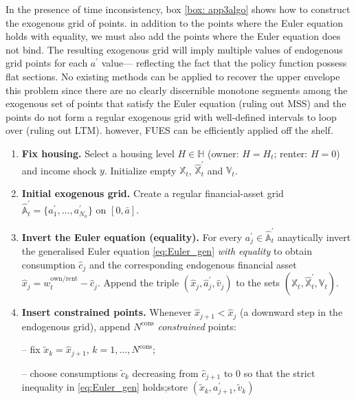 \documentclass[12pt]{article}
\begin{document}
In the presence of time inconsistency, box \ref{box: app3algo} shows how to construct the exogenous grid of points. in addition to the points where the Euler equation holds with equality, we must also add the points where the Euler equation does not bind. The resulting exogenous grid will imply multiple values of endogenous grid points for each $a^{\prime}$ value--- reflecting the fact that the policy function possess flat sections. No existing methods can be applied to recover the upper envelope this problem since there are no clearly discernible monotone segments among the exogenous set of points that satisfy the Euler equation (ruling out MSS) and the points do not form a regular exogenous grid with well-defined intervals to loop over (ruling out LTM). however, FUES can be efficiently applied off the shelf. 

\begin{tcolorbox}[
  colframe=black!100,
  colback=white!10,
  fonttitle=\bfseries,
  adjusted title=Box 3: Exogenous-grid construction for the present-bias model]

\begin{enumerate}
  \item \textbf{Fix housing.}\;
        Select a housing level $H\in\mathbb H$ (owner: $H=H_{t}$; renter: $H=0$) and income shock $y$. Initialize empty $\mathbb{X}_{t}$, $\hat{\mathbb{X}}^{\prime}_{t}$ and $\mathbb{V}_{t}$. 

  \item \textbf{Initial exogenous grid.}\;
        Create a regular financial-asset grid
        $\hat{\mathbb A}_{t}^{\prime}=\{a_{1}^{\prime},\dots,a_{N_{a}}^{\prime}\}$
        on $[0,\bar a]$.

  \item \textbf{Invert the Euler equation (equality).}\;
        For every $a_{j}^{\prime}\in\hat{\mathbb A}_{t}^{\prime}$  
        anaytically invert the generalised Euler equation \eqref{eq:Euler_gen} \emph{with equality}  
        to obtain consumption $\hat c_{j}$ and the corresponding endogenous financial asset  
        $\hat x_{j}=w^{\mathrm{own/rent}}_{t}-\hat c_{j}$.  
        Append the triple  
        $(\hat x_{j},\hat{a}_{j}^{\prime},\hat v_{j})$ to the sets $(\mathbb{X}_{t}, \hat{\mathbb{X}}_{t}^{\prime}, \mathbb{V}_{t})$.

  \item \textbf{Insert constrained points.}\;
        Whenever $\hat x_{j+1}<\hat x_{j}$  
        (a downward step in the endogenous grid),  
        append $N^{\mathrm{cons}}$ \emph{constrained} points:\par
        \hspace{1em}-- fix $\tilde x_{k}=\hat x_{j+1}$,\; $k=1,\dots,N^{\mathrm{cons}}$;\par
        \hspace{1em}-- choose consumptions $\tilde c_{k}$ decreasing from $\hat c_{j+1}$ to $0$  
        so that the strict inequality in \eqref{eq:Euler_gen} holds;store $(\tilde x_{k},a_{j+1}^{\prime},\tilde v_{k})$ \par


\end{enumerate}
\end{tcolorbox}
\end{document}
